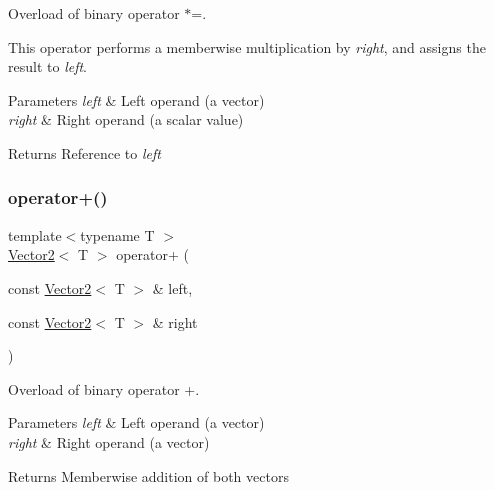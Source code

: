 Overload of binary operator $\ast$=. 

This operator performs a memberwise multiplication by {\itshape right}, and assigns the result to {\itshape left}.


\begin{DoxyParams}{Parameters}
{\em left} & Left operand (a vector) \\
\hline
{\em right} & Right operand (a scalar value)\\
\hline
\end{DoxyParams}
\begin{DoxyReturn}{Returns}
Reference to {\itshape left} \begin{DoxyVerb}\end{DoxyVerb}
 
\end{DoxyReturn}
\mbox{\label{classsf_1_1_vector2_a72421239823c38a6b780c86a710ead07}} 
\subsubsection{\texorpdfstring{operator+()}{operator+()}}
{\footnotesize\ttfamily template$<$typename T $>$ \\
\mbox{\hyperlink{classsf_1_1_vector2}{Vector2}}$<$ T $>$ operator+ (\begin{DoxyParamCaption}\item[{const \mbox{\hyperlink{classsf_1_1_vector2}{Vector2}}$<$ T $>$ \&}]{left,  }\item[{const \mbox{\hyperlink{classsf_1_1_vector2}{Vector2}}$<$ T $>$ \&}]{right }\end{DoxyParamCaption})\hspace{0.3cm}{\ttfamily [related]}}



Overload of binary operator +. 


\begin{DoxyParams}{Parameters}
{\em left} & Left operand (a vector) \\
\hline
{\em right} & Right operand (a vector)\\
\hline
\end{DoxyParams}
\begin{DoxyReturn}{Returns}
Memberwise addition of both vectors \begin{DoxyVerb}\end{DoxyVerb}
 
\end{DoxyReturn}
\mbox{\label{classsf_1_1_vector2_ad4b7a9d355d57790bfc7df0ade8bb628}} 
